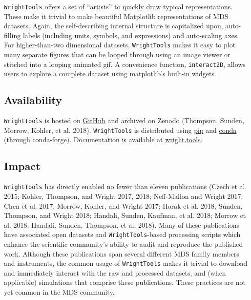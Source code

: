 \texttt{WrightTools} offers a set of ``artists'' to quickly draw typical
representations. These make it trivial to make beautiful Matplotlib
representations of MDS datasets. Again, the self-describing internal
structure is capitalized upon, auto-filling labels (including units,
symbols, and expressions) and auto-scaling axes. For higher-than-two
dimensional datasets, \texttt{WrightTools} makes it easy to plot many
separate figures that can be looped through using an image viewer or
stitched into a looping animated gif. A convenience function,
\texttt{interact2D}, allows users to explore a complete dataset using
matplotlib's built-in widgets.

\hypertarget{availability}{%
\subsection{Availability}\label{availability}}

\texttt{WrightTools} is hosted on
\href{http://github.com/wright-group/WrightTools/}{GitHub} and archived
on Zenodo (Thompson, Sunden, Morrow, Kohler, et al. 2018).
\texttt{WrightTools} is distributed using
\href{http://pypi.org/project/WrightTools/}{pip} and
\href{http://anaconda.org/conda-forge/wrighttools}{conda} (through
conda-forge). Documentation is available at
\href{http://wright.tools}{wright.tools}.

\hypertarget{impact}{%
\subsection{Impact}\label{impact}}

\texttt{WrightTools} has directly enabled no fewer than eleven
publications (Czech et al. 2015; Kohler, Thompson, and Wright 2017,
2018; Neff-Mallon and Wright 2017; Chen et al. 2017; Morrow, Kohler, and
Wright 2017; Horak et al. 2018; Sunden, Thompson, and Wright 2018;
Handali, Sunden, Kaufman, et al. 2018; Morrow et al. 2018; Handali,
Sunden, Thompson, et al. 2018). Many of these publications have
associated open datasets and \texttt{WrightTools}-based processing
scripts which enhance the scientific community's ability to audit and
reproduce the published work. Although these publications span several
different MDS family members and instruments, the common usage of
\texttt{WrightTools} makes it trivial to download and immediately
interact with the raw and processed datasets, and (when applicable)
simulations that comprise these publications. These practices are not
yet common in the MDS community.

